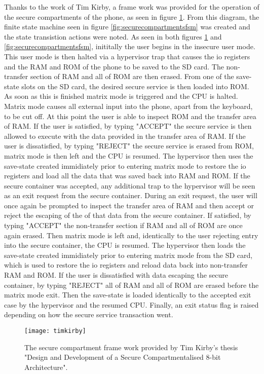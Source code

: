 Thanks to the work of Tim Kirby, a frame work was provided for the operation of the secure compartments of the phone, as seen in figure \ref{fig:timkirby}. From this diagram, the finite state machine seen in figure \ref{fig:securecompartmentsfsm} was created and the state transistion actions were noted. As seen in both figures \ref{fig:timkirby} and \ref{fig:securecompartmentsfsm}, inititally the user begins in the insecure user mode. This user mode is then halted via a hypervisor trap that causes the io registers and the RAM and ROM of the phone to be saved to the SD card. The non-transfer section of RAM and all of ROM are then erased. From one of the save-state slots on the SD card, the desired secure service is then loaded into ROM. As soon as this is finished matrix mode is triggered and the CPU is halted. Matrix mode causes all external input into the phone, apart from the keyboard, to be cut off. At this point the user is able to inspect ROM and the transfer area of RAM. If the user is satisfied, by typing "ACCEPT" the secure service is then allowed to execute with the data provided in the transfer area of RAM. If the user is dissatisfied, by typing "REJECT" the secure service is erased from ROM, matrix mode is then left and the CPU is resumed. The hypervisor then uses the save-state created immidiately prior to entering matrix mode to restore the io registers and load all the data that was saved back into RAM and ROM. If the secure container was accepted, any additional trap to the hypervisor will be seen as an exit request from the secure container. During an exit request, the user will once again be prompted to inspect the transfer area of RAM and then accept or reject the escaping of the of that data from the secure container. If satisfied, by typing "ACCEPT" the non-transfer section if RAM and all of ROM are once again erased. Then matrix mode is left and, identically to the user rejecting entry into the secure container, the CPU is resumed. The hypervisor then loads the save-state created immidiately prior to entering matrix mode from the SD card, which is used to restore the io registers and reload data back into non-transfer RAM and ROM. If the user is dissatisfied with data escaping the secure container, by typing "REJECT" all of RAM and all of ROM are erased before the matrix mode exit. Then the save-state is loaded identically to the accepted exit case by the hypervisor and the resumed CPU. Finally, an exit status flag is raised depending on how the secure service transaction went.

\begin{figure}
  \centering
  \texttt{[image: timkirby]}
  \caption{The secure compartment frame work provided by Tim Kirby's thesis "Design and Development of a Secure Compartmentalised 8-bit Architecture".}
  \label{fig:timkirby}
\end{figure}

